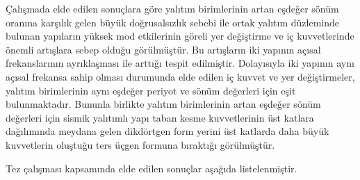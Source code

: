 Çalışmada elde edilen sonuçlara göre yalıtım birimlerinin artan eşdeğer
sönüm oranına karşılık gelen büyük doğrusalsızlık sebebi ile ortak
yalıtım düzleminde bulunan yapıların yüksek mod etkilerinin göreli
yer değiştirme ve iç kuvvetlerinde önemli artışlara sebep olduğu görülmüştür.
Bu artışların iki yapının açısal frekanslarının ayrıklaşması ile arttığı
tespit edilmiştir. Dolayısıyla iki yapının aynı açısal frekansa sahip
olması durumunda elde edilen iç kuvvet ve yer değiştirmeler, yalıtım
birimlerinin aynı eşdeğer periyot ve sönüm değerleri için eşit bulunmaktadır.
Bununla birlikte yalıtım birimlerinin artan eşdeğer sönüm değerleri
için sismik yalıtımlı yapı taban kesme kuvvetlerinin üst katlara dağılımında
meydana gelen dikdörtgen form yerini üst katlarda daha büyük kuvvetlerin
oluştuğu ters üçgen formuna bıraktığı görülmüştür.

Tez çalışması kapsamında elde edilen sonuçlar aşağıda listelenmiştir. 
